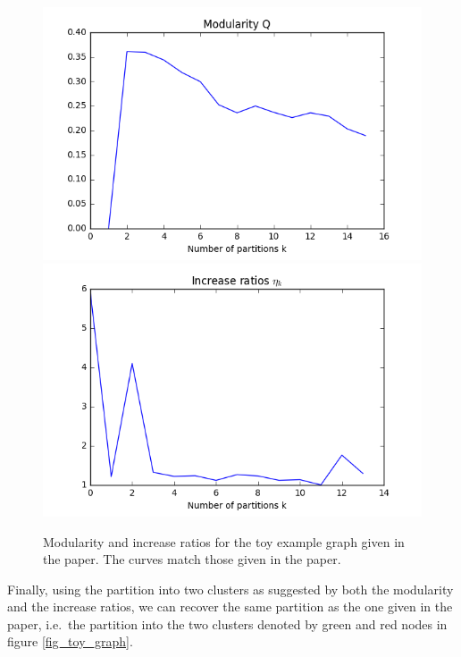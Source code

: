 \documentclass[12pt]{article}
\theoremstyle{definition}
\begin{document}
\begin{figure}
	\includegraphics[scale=0.44]{toy_graph_Q}
	\includegraphics[scale=0.44]{toy_graph_eta}
	\centering
	\caption{Modularity and increase ratios for the toy example graph given in the paper. The curves match those given in the paper.}
	\label{fig_toy_graph_eval}
\end{figure}

Finally, using the partition into two clusters as suggested by both the modularity and the increase ratios, we can recover the same partition as the one given in the paper, i.e.\ the partition into the two clusters denoted by green and red nodes in figure \ref{fig_toy_graph}.
\end{document}
